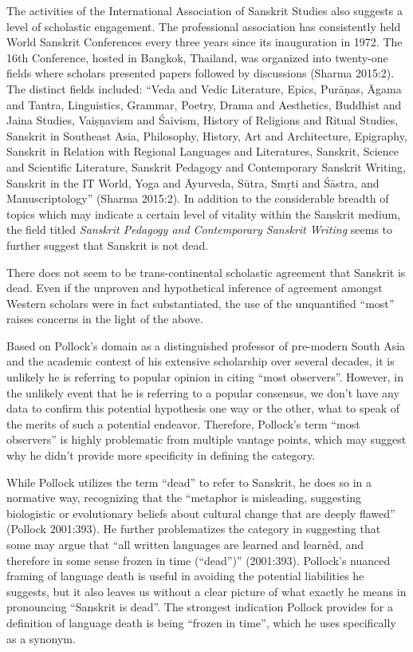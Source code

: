 The activities of the International Association of Sanskrit Studies also suggests a level of scholastic engagement. The professional association has consistently held World Sanskrit Conferences every three years since its inauguration in 1972. The 16th Conference, hosted in Bangkok, Thailand, was organized into twenty-one fields where scholars presented papers followed by discussions (Sharma 2015:2). The distinct fields included: “Veda and Vedic Literature, Epics, Purāṇas, Āgama and Tantra, Linguistics, Grammar, Poetry, Drama and Aesthetics, Buddhist and Jaina Studies, Vaiṣṇavism and Śaivism, History of Religions and Ritual Studies, Sanskrit in Southeast Asia, Philosophy, History, Art and Architecture, Epigraphy, Sanskrit in Relation with Regional Languages and Literatures, Sanskrit, Science and Scientific Literature, Sanskrit Pedagogy and Contemporary Sanskrit Writing, Sanskrit in the IT World, Yoga and Āyurveda, Sūtra, Smṛti and Śāstra, and Manuscriptology” (Sharma 2015:2). In addition to the considerable breadth of topics which may indicate a certain level of vitality within the Sanskrit medium, the field titled {\sl Sanskrit Pedagogy and Contemporary Sanskrit Writing} seems to further suggest that Sanskrit is not dead.

There does not seem to be trans-continental scholastic agreement that Sanskrit is dead. Even if the unproven and hypothetical inference of agreement amongst Western scholars were in fact substantiated, the use of the unquantified “most” raises concerns in the light of the above. 

Based on Pollock’s domain as a distinguished professor of pre-modern South Asia and the academic context of his extensive scholarship over several decades, it is unlikely he is referring to popular opinion in citing “most observers”. However, in the unlikely event that he is referring to a popular consensus, we don’t have any data to confirm this potential hypothesis one way or the other, what to speak of the merits of such a potential endeavor. Therefore, Pollock’s term “most observers” is highly problematic from multiple vantage points, which may suggest why he didn’t provide more specificity in defining the category. 

While Pollock utilizes the term “dead” to refer to Sanskrit, he does so in a normative way, recognizing that the “metaphor is misleading, suggesting biologistic or evolutionary beliefs about cultural change that are deeply flawed” (Pollock 2001:393). He further problematizes the category in suggesting that some may argue that “all written languages are learned and learnèd, and therefore in some sense frozen in time (“dead”)” (2001:393). Pollock’s nuanced framing of language death is useful in avoiding the potential liabilities he suggests, but it also leaves us without a clear picture of what exactly he means in pronouncing “Sanskrit is dead”. The strongest indication Pollock provides for a definition of language death is being  “frozen in time”, which he uses specifically as a synonym. 


